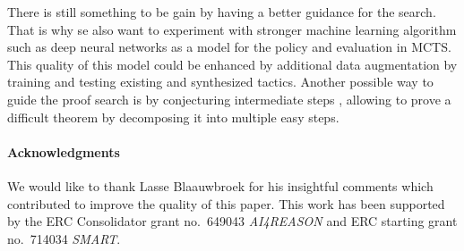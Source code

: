 \documentclass[runningheads,a4paper,draft]{svjour3}
\begin{document}
There is still something to be gain by having a better guidance for the search. 
That is why se also want to experiment with stronger machine learning algorithm 
such as deep neural networks as a model for the policy and evaluation in MCTS.
This quality of this model could be enhanced by additional data augmentation by 
training and testing existing and synthesized tactics.
Another possible way to guide the proof search is by conjecturing intermediate 
steps \cite{}, allowing to prove a difficult theorem by decomposing it into 
multiple easy steps.



\paragraph{Acknowledgments}\label{sect:acks}
We would like to thank Lasse Blaauwbroek for his insightful comments which
contributed to improve the quality of this paper. This work has been supported 
by the ERC Consolidator grant no.\ 649043 \textit{AI4REASON} and ERC starting
grant no.\ 714034 \textit{SMART}.



\end{document}
